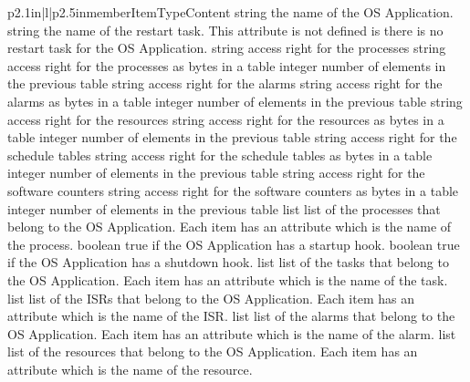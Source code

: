 \begin{longtableiii}{p{2.1in}|l|p{2.5in}}{member}{Item}{Type}{Content}
  {string}
  {the name of the OS Application.}
  {string}
  {the name of the restart task. This attribute is not defined is there is no restart task for the OS Application.}
  {string}
  {access right for the processes}
  {string}
  {access right for the processes as bytes in a table}
  {integer}
  {number of elements in the previous table}
  {string}
  {access right for the alarms}
  {string}
  {access right for the alarms as bytes in a table}
  {integer}
  {number of elements in the previous table}
  {string}
  {access right for the resources}
  {string}
  {access right for the resources as bytes in a table}
  {integer}
  {number of elements in the previous table}
  {string}
  {access right for the schedule tables}
  {string}
  {access right for the schedule tables as bytes in a table}
  {integer}
  {number of elements in the previous table}
  {string}
  {access right for the software counters}
  {string}
  {access right for the software counters as bytes in a table}
  {integer}
  {number of elements in the previous table}
  {list}
  {list of the processes that belong to the OS Application. Each item has an attribute  which is the name of the process.}
  {boolean}
  {true if the OS Application has a startup hook.}
  {boolean}
  {true if the OS Application has a shutdown hook.}
  {list}
  {list of the tasks that belong to the OS Application. Each item has an attribute  which is the name of the task.}
  {list}
  {list of the ISRs that belong to the OS Application. Each item has an attribute  which is the name of the ISR.}
  {list}
  {list of the alarms that belong to the OS Application. Each item has an attribute  which is the name of the alarm.}
  {list}
  {list of the resources that belong to the OS Application. Each item has an attribute  which is the name of the resource.}

\end{longtableiii}
